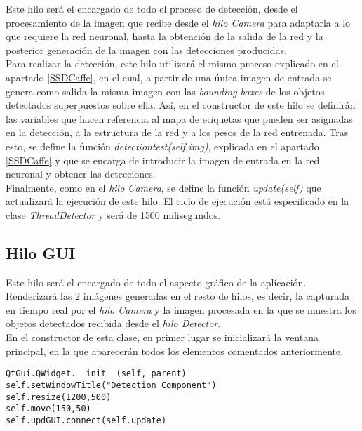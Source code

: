 \documentclass[a4paper, 12pt, oneside]{book}
\begin{document}
Este hilo será el encargado de todo el proceso de detección, desde el procesamiento de la imagen que recibe desde el \textit{hilo Camera} para adaptarla a lo que requiere la red neuronal, hasta la obtención de la salida de la red y la posterior generación de la imagen con las detecciones producidas.\\

Para realizar la detección, este hilo utilizará el mismo proceso explicado en el apartado \ref{SSDCaffe}, en el cual, a partir de una única imagen de entrada se genera como salida la misma imagen con las \textit{bounding boxes} de los objetos detectados superpuestos sobre ella. Así, en el constructor de este hilo se definirán las variables que hacen referencia al mapa de etiquetas que pueden ser asignadas en la detección, a la estructura de la red y a los pesos de la red entrenada. Tras esto, se define la función \textit{detectiontest(self,img)}, explicada en el apartado \ref{SSDCaffe} y que se encarga de introducir la imagen de entrada en la red neuronal y obtener las detecciones.\\

Finalmente, como en el \textit{hilo Camera}, se define la función \textit{update(self)} que actualizará la ejecución de este hilo. El ciclo de ejecución está especificado en la clase \textit{ThreadDetector} y será de 1500 milisegundos.

\subsection{Hilo GUI}

Este hilo será el encargado de todo el aspecto gráfico de la aplicación. Renderizará las 2 imágenes generadas en el resto de hilos, es decir, la capturada en tiempo real por el \textit{hilo Camera} y la imagen procesada en la que se muestra los objetos detectados recibida desde el \textit{hilo Detector}.\\

En el constructor de esta clase, en primer lugar se inicializará la ventana principal, en la que aparecerán todos los elementos comentados anteriormente.\\

\begin{lstlisting}[frame=single]
QtGui.QWidget.__init__(self, parent)
self.setWindowTitle("Detection Component")
self.resize(1200,500)
self.move(150,50)
self.updGUI.connect(self.update)
\end{lstlisting}
\end{document}
